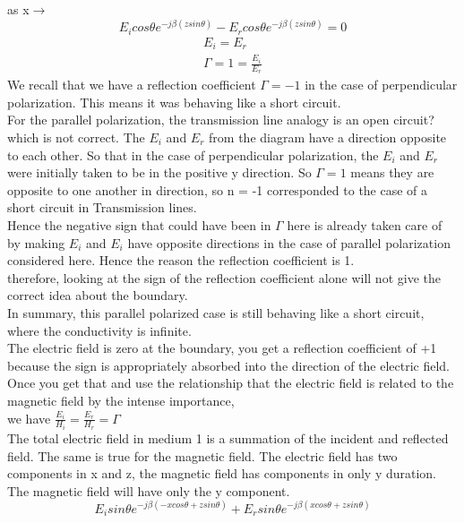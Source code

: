 as x$\rightarrow$
\begin{equation*}
E_{i}cos\theta e^{-j\beta(zsin\theta)} - E_{r}cos\theta e^{-j\beta(zsin\theta)} = 0
\end{equation*}
\begin{align*}
E_{i} = E_{r}\\
\Gamma= 1 = \frac{E_{i}}{E_{r}}
\end{align*}
We recall that we have a reflection coefficient $\Gamma = -1$ in the case of perpendicular polarization. This means it was behaving like a short circuit.\\
For the parallel polarization, the transmission line analogy is an open circuit? which is not correct. The $E_{i}$ and $E_{r}$ from the diagram have a direction opposite to each other. So that in the case of perpendicular polarization, the $E_{i}$ and $ E_{r}$  were initially taken to be in the positive y direction. So   $\Gamma = 1$ means they are opposite to one another in direction, so n = -1 corresponded to the case of a short circuit in Transmission lines.\\
Hence the negative sign that could have been in $\Gamma$ here is already taken care of by making $E_{i}$ and $E_{i}$ have opposite directions in the case of parallel polarization considered here. Hence the reason the reflection coefficient is 1.\\
therefore, looking at the sign of the reflection coefficient alone will not give the correct idea about the boundary.\\ 
In summary, this parallel polarized case is still behaving like a short circuit, where the conductivity is infinite.\\ 
The electric field is zero at the boundary, you get a reflection coefficient of +1 because the sign is appropriately absorbed into the direction of the electric field. Once you get that and use the relationship that the electric field is related to the magnetic field by the intense importance,\\
we have $\frac{E_{i}}{H_{i}} = \frac{E_{r}}{H_{r}} =\Gamma$\\
The total electric field in medium 1 is a summation of the incident and reflected field. The same is true for the magnetic field. The electric field has two components in x and z, the magnetic field has components in only y duration.\\
The magnetic field will have only the y component.
\begin{equation*}
E_{i}sin\theta e^{-j\beta(-xcos\theta + zsin\theta)} + E_{r}sin\theta e^{-j\beta(xcos\theta + zsin\theta)}
\end{equation*}
